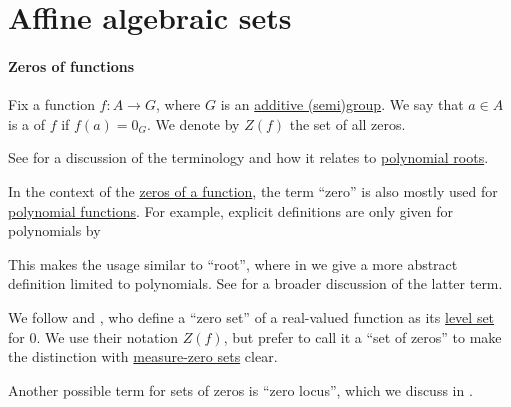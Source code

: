\section{Affine algebraic sets}\label{sec:affine_algebraic_sets}

\paragraph{Zeros of functions}

\begin{definition}\label{def:zero_of_function}\mimprovised
  Fix a function \( f: A \to G \), where \( G \) is an \hyperref[con:additive_semigroup]{additive (semi)group}. We say that \( a \in A \) is a  of \( f \) if \( f(a) = 0_G \). We denote by \( Z(f) \) the set of all zeros.
\end{definition}
\begin{comments}
  \item See  for a discussion of the terminology and how it relates to \hyperref[def:root_of_polynomial]{polynomial roots}.
\end{comments}

\begin{remark}\label{rem:zero_of_function_terminology}
  In the context of the \hyperref[def:zero_of_function]{zeros of a function}, the term \enquote{zero} is also mostly used for \hyperref[con:evaluation_homomorphism]{polynomial functions}. For example, explicit definitions are only given for polynomials by

  This makes the usage similar to \enquote{root}, where in  we give a more abstract definition limited to polynomials. See  for a broader discussion of the latter term.

  We follow  and , who define a \enquote{zero set} of a real-valued function as its \hyperref[def:level_set]{level set} for \( 0 \). We use their notation \( Z(f) \), but prefer to call it a \enquote{set of zeros} to make the distinction with \hyperref[con:measure_zero_set]{measure-zero sets} clear.

  Another possible term for sets of zeros is \enquote{zero locus}, which we discuss in .
\end{remark}

